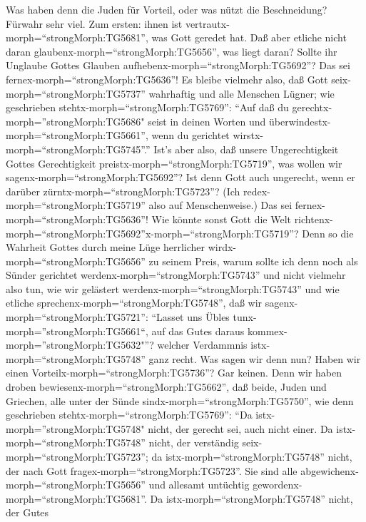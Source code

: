  Was haben denn die Juden für Vorteil, oder was nützt die
Beschneidung?  Fürwahr sehr viel. Zum ersten: ihnen ist
vertrautx-morph=``strongMorph:TG5681'', was Gott geredet hat.
 Daß aber etliche nicht daran
glaubenx-morph=``strongMorph:TG5656'', was liegt daran? Sollte ihr
Unglaube Gottes Glauben aufhebenx-morph=``strongMorph:TG5692''?
 Das sei fernex-morph=``strongMorph:TG5636''! Es bleibe
vielmehr also, daß Gott seix-morph=``strongMorph:TG5737'' wahrhaftig und
alle Menschen Lügner; wie geschrieben
stehtx-morph=``strongMorph:TG5769'': ``Auf daß du
gerechtx-morph=''strongMorph:TG5686" seist in deinen Worten und
überwindestx-morph=``strongMorph:TG5661'', wenn du gerichtet
wirstx-morph=``strongMorph:TG5745''.''  Ist's aber also, daß
unsere Ungerechtigkeit Gottes Gerechtigkeit
preistx-morph=``strongMorph:TG5719'', was wollen wir
sagenx-morph=``strongMorph:TG5692''? Ist denn Gott auch ungerecht, wenn
er darüber zürntx-morph=``strongMorph:TG5723''? (Ich
redex-morph=``strongMorph:TG5719'' also auf Menschenweise.) 
Das sei fernex-morph=``strongMorph:TG5636''! Wie könnte sonst Gott die
Welt
richtenx-morph=``strongMorph:TG5692''\textbar x-morph=``strongMorph:TG5719''?
 Denn so die Wahrheit Gottes durch meine Lüge herrlicher
wirdx-morph=``strongMorph:TG5656'' zu seinem Preis, warum sollte ich
denn noch als Sünder gerichtet werdenx-morph=``strongMorph:TG5743''
 und nicht vielmehr also tun, wie wir gelästert
werdenx-morph=``strongMorph:TG5743'' und wie etliche
sprechenx-morph=``strongMorph:TG5748'', daß wir
sagenx-morph=``strongMorph:TG5721'': ``Lasset uns Übles
tunx-morph=''strongMorph:TG5661``, auf das Gutes daraus
kommex-morph=''strongMorph:TG5632"''? welcher Verdammnis
istx-morph=``strongMorph:TG5748'' ganz recht.  Was sagen wir
denn nun? Haben wir einen Vorteilx-morph=``strongMorph:TG5736''? Gar
keinen. Denn wir haben droben bewiesenx-morph=``strongMorph:TG5662'',
daß beide, Juden und Griechen, alle unter der Sünde
sindx-morph=``strongMorph:TG5750'',  wie denn geschrieben
stehtx-morph=``strongMorph:TG5769'': ``Da
istx-morph=''strongMorph:TG5748" nicht, der gerecht sei, auch nicht
einer.  Da istx-morph=``strongMorph:TG5748'' nicht, der
verständig seix-morph=``strongMorph:TG5723''; da
istx-morph=``strongMorph:TG5748'' nicht, der nach Gott
fragex-morph=``strongMorph:TG5723''.  Sie sind alle
abgewichenx-morph=``strongMorph:TG5656'' und allesamt untüchtig
gewordenx-morph=``strongMorph:TG5681''. Da
istx-morph=``strongMorph:TG5748'' nicht, der Gutes
